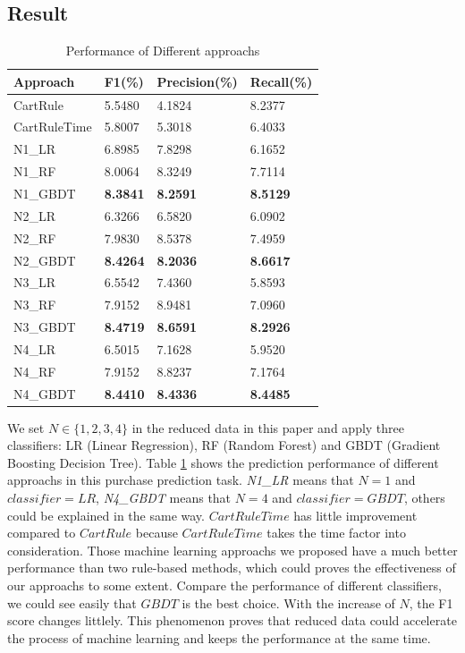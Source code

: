 \documentclass{llncs}
\begin{document}
\subsection{Result}
\begin{table}[htbp]
	\normalsize
	\centering
	\caption{Performance of Different approachs}
	\begin{tabular}{|p{80pt}|p{60pt}|p{60pt}|p{60pt}|}
		\hline
		Approach & F1(\%) & Precision(\%) & Recall(\%) \\
		\hline
		CartRule & 5.5480 & 4.1824 & 8.2377 \\
		CartRuleTime & 5.8007 & 5.3018 & 6.4033 \\
		\hline
		N1\_LR & 6.8985 & 7.8298 & 6.1652 \\
		N1\_RF & 8.0064 & 8.3249 & 7.7114 \\
		N1\_GBDT & \textbf{8.3841} & \textbf{8.2591} & \textbf{8.5129} \\
		\hline
		N2\_LR & 6.3266 & 6.5820 & 6.0902 \\
		N2\_RF & 7.9830 & 8.5378 & 7.4959 \\
		N2\_GBDT & \textbf{8.4264} & \textbf{8.2036} & \textbf{8.6617} \\
		\hline
		N3\_LR & 6.5542 & 7.4360 & 5.8593 \\
		N3\_RF & 7.9152 & 8.9481 & 7.0960 \\
		N3\_GBDT & \textbf{8.4719} & \textbf{8.6591} & \textbf{8.2926} \\
		\hline
		N4\_LR & 6.5015 & 7.1628 & 5.9520 \\
		N4\_RF & 7.9152 & 8.8237 & 7.1764 \\
		N4\_GBDT & \textbf{8.4410} & \textbf{8.4336} & \textbf{8.4485} \\
		\hline
	\end{tabular}
	\label{tab:score}
\end{table}

We set $N \in \{ 1, 2, 3, 4\}$ in the reduced data in this paper
and apply three classifiers: LR (Linear Regression), RF (Random Forest) and GBDT (Gradient Boosting Decision Tree).
Table \ref{tab:score} shows the prediction performance of different approachs
in this purchase prediction task.
\textit{N1\_LR} means that $N = 1$ and $classifier = LR$,
\textit{N4\_GBDT} means that $N = 4$ and $classifier = GBDT$,
others could be explained in the same way.
$CartRuleTime$ has little improvement compared to $CartRule$
because $CartRuleTime$ takes the time factor into consideration.
Those machine learning approachs we proposed have a much better performance
than two rule-based methods, which could proves the effectiveness of our approachs to some extent.
Compare the performance of different classifiers,
we could see easily that $GBDT$ is the best choice.
With the increase of $N$, the F1 score changes littlely.
This phenomenon proves that reduced data could accelerate
the process of machine learning and keeps the performance at the same time.
\end{document}
